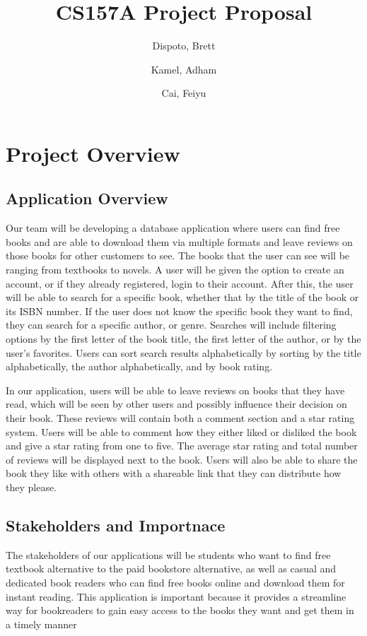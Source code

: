 \documentclass[titlepage]{article}
\author{ Dispoto, Brett\\
	\and
	Kamel, Adham\\
	\and
	Cai, Feiyu\\
}
\title{CS157A Project Proposal}
\begin{document}
	\maketitle
	\section{Project Overview}
	\subsection{Application Overview}
	Our team will be developing a database application where users can find free books and are able to download them via multiple formats and leave reviews on those books for other customers to see. The books that the user can see will be ranging from textbooks to novels. A user will be given the option to create an account, or if they already registered, login to their account. After this, the user will be able to search for a specific book, whether that by the title of the book or its ISBN number. If the user does not know the specific book they want to find, they can search for a specific author, or genre. Searches will include filtering options by the first letter of the book title, the first letter of the author, or by the user's favorites. Users can sort search results alphabetically by sorting by the title alphabetically, the author alphabetically, and by book rating.


	In our application, users will be able to leave reviews on books that they have read, which will be seen by other users and possibly influence their decision on their book. These reviews will contain both a comment section and a star rating system. Users will be able to comment how they either liked or disliked the book and give a star rating from one to five. The average star rating and total number of reviews will be displayed next to the book. Users will also be able to share the book they like with others with a shareable link that they can distribute how they please.
	\subsection{Stakeholders and Importnace}
	The stakeholders of our applications will be students who want to find free textbook alternative to the paid bookstore alternative, as well as casual and dedicated book readers who can find free books online and download them for instant reading. This application is important because it provides a streamline way for bookreaders to gain easy access to the books they want and get them in a timely manner
\end{document}
